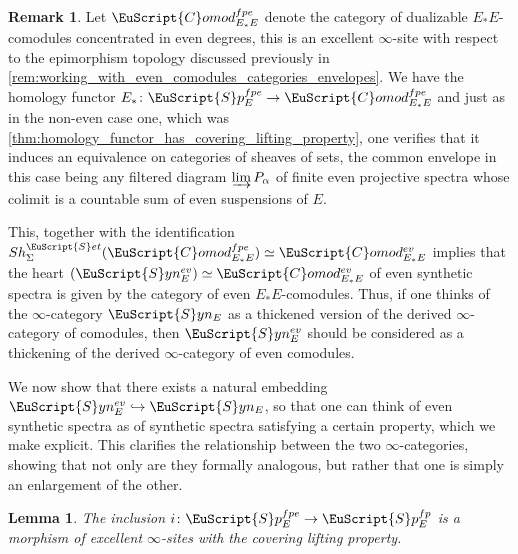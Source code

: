 \documentclass[oneside,a4paper]{amsart}
\newcommand{\euscr}[1]{\EuScript{#1}} %
\newcommand{\spectra}{\euscr{S}p} %
\newcommand{\sets}{\euscr{S}et} %
\newcommand{\synspectra}{\euscr{S}yn} %
\newcommand{\Comod}{\euscr{C}omod} %
\newcommand{\ComodE}{\Comod_{E_{*}E}} %
\theoremstyle{plain}
\newtheorem{lemma}[thm]{Lemma}
\theoremstyle{definition}
\newtheorem{rem}[thm]{Remark}
\theoremstyle{remark}
\begin{document}
\begin{rem}
\label{rem:heart_of_even_synthetic_spectra_and_common_envelope_with_comodules}
Let $\ComodE^{fpe}$ denote the category of dualizable $E_{*}E$-comodules concentrated in even degrees, this is an excellent $\infty$-site with respect to the epimorphism topology discussed previously in \cref{rem:working_with_even_comodules_categories_envelopes}. We have the homology functor $E_{*} \colon \spectra_{E}^{fpe} \rightarrow \ComodE^{fpe}$ and just as in the non-even case one, which was \cref{thm:homology_functor_has_covering_lifting_property}, one verifies that it induces an equivalence on categories of sheaves of sets, the common envelope in this case being any filtered diagram $\varinjlim P_{\alpha}$ of finite even projective spectra whose colimit is a countable sum of even suspensions of $E$. 

This, together with the identification $Sh_{\Sigma}^{\sets}(\ComodE^{fpe}) \simeq \ComodE^{ev}$ implies that the heart $(\synspectra_{E}^{ev}) \simeq \ComodE^{ev}$ of even synthetic spectra is given by the category of even $E_{*}E$-comodules. Thus, if one thinks of the $\infty$-category $\synspectra_{E}$ as a thickened version of the derived $\infty$-category of comodules, then $\synspectra_{E}^{ev}$ should be considered as a thickening of the derived $\infty$-category of even comodules. 
\end{rem}

We now show that there exists a natural embedding $\synspectra_{E}^{ev} \hookrightarrow \synspectra_{E}$, so that one can think of even synthetic spectra as of synthetic spectra satisfying a certain property, which we make explicit. This clarifies the relationship between the two $\infty$-categories, showing that not only are they formally analogous, but rather that one is simply an enlargement of the other.

\begin{lemma}
\label{lemma:inclusion_of_finite_even_projectives_has_clp}
The inclusion $i \colon \spectra_{E}^{fpe} \rightarrow \spectra_{E}^{fp}$ is a morphism of excellent $\infty$-sites with the covering lifting property.
\end{lemma}
\end{document}
